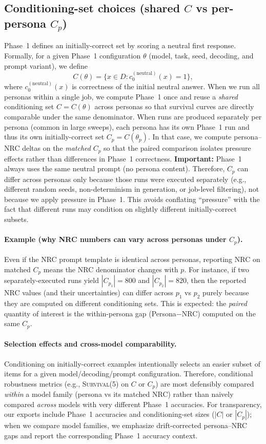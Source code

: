 \documentclass[11pt]{article}
\newcommand{\SurvivalAt}[1]{\textsc{Survival}(#1)}
\newcommand{\NRC}{\textup{\textsc{NRC}}}
\begin{document}
\subsection{Conditioning-set choices (shared $C$ vs per-persona $C_p$)}
\label{sec:conditioning-set}
Phase~1 defines an initially-correct set by scoring a neutral first response. Formally, for a given Phase~1 configuration $\theta$ (model, task, seed, decoding, and prompt variant), we define
\[
C(\theta)=\{x\in D : c^{(\mathrm{neutral})}_{0}(x)=1\},
\]
where $c^{(\mathrm{neutral})}_{0}(x)$ is correctness of the initial neutral answer.
When we run all personas within a single job, we compute Phase~1 once and reuse a \emph{shared} conditioning set $C=C(\theta)$ across personas so that survival curves are directly comparable under the same denominator.
When runs are produced separately per persona (common in large sweeps), each persona has its own Phase~1 run and thus its own initially-correct set $C_p=C(\theta_p)$. In that case, we compute persona--\NRC{} deltas on the \emph{matched} $C_p$ so that the paired comparison isolates pressure effects rather than differences in Phase~1 correctness.
\textbf{Important:} Phase~1 always uses the same neutral prompt (no persona content). Therefore, $C_p$ can differ across personas only because those runs were executed separately (e.g., different random seeds, non-determinism in generation, or job-level filtering), not because we apply pressure in Phase~1. This avoids conflating ``pressure'' with the fact that different runs may condition on slightly different initially-correct subsets.

\paragraph{Example (why \NRC{} numbers can vary across personas under $C_p$).}
Even if the \NRC{} prompt template is identical across personas, reporting \NRC{} on matched $C_p$ means the \NRC{} denominator changes with $p$.
For instance, if two separately-executed runs yield $|C_{p_1}|=800$ and $|C_{p_2}|=820$, then the reported \NRC{} values (and their uncertainties) can differ across $p_1$ vs $p_2$ purely because they are computed on different conditioning sets.
This is expected: the \emph{paired} quantity of interest is the within-persona gap (Persona$-$\NRC{}) computed on the same $C_p$.

\paragraph{Selection effects and cross-model comparability.}
Conditioning on initially-correct examples intentionally selects an easier subset of items for a given model/decoding/prompt configuration.
Therefore, conditional robustness metrics (e.g., \SurvivalAt{5} on $C$ or $C_p$) are most defensibly compared \emph{within} a model family (persona vs its matched \NRC{}) rather than naively compared \emph{across} models with very different Phase~1 accuracies.
For transparency, our exports include Phase~1 accuracies and conditioning-set sizes (\(|C|\) or \(|C_p|\)); when we compare model families, we emphasize drift-corrected persona--\NRC{} gaps and report the corresponding Phase~1 accuracy context.
\end{document}
